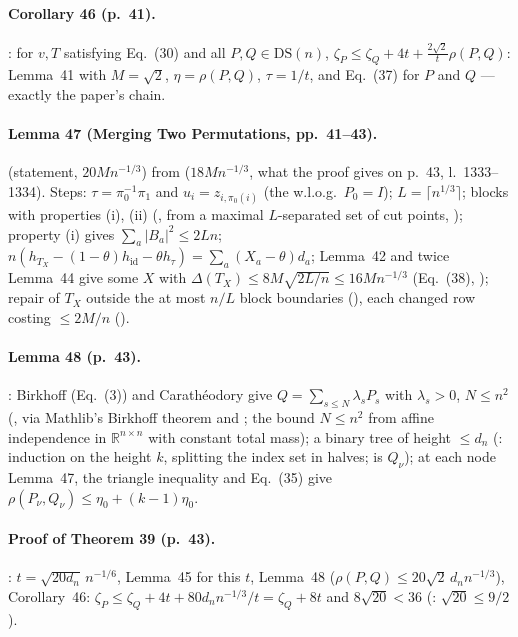 \paragraph{Corollary 46 (p.~41).} : for $v,T$ satisfying Eq.~(30) and all $P,Q\in\mathrm{DS}(n)$,
$\zeta_P\le\zeta_Q+4t+\frac{2\sqrt2}{t}\rho(P,Q)$: Lemma~41 with $M=\sqrt2$, $\eta=\rho(P,Q)$, $\tau=1/t$, and Eq.~(37)
for $P$ and $Q$ --- exactly the paper's chain.

\paragraph{Lemma 47 (Merging Two Permutations, pp.~41--43).}  (statement, $20Mn^{-1/3}$) from
 ($18Mn^{-1/3}$, what the proof gives on p.~43, l.~1333--1334). Steps: $\tau=\pi_0^{-1}\pi_1$ and
$u_i=z_{i,\pi_0(i)}$ (the w.l.o.g.\ $P_0=I$); $L=\lceil n^{1/3}\rceil$; blocks with properties (i), (ii)
(, from a maximal $L$-separated set of cut points, ); property (i) gives
$\sum_a|B_a|^2\le2Ln$; $n(h_{T_X}-(1-\theta)h_{\mathrm{id}}-\theta h_\tau)=\sum_a(X_a-\theta)d_a$; Lemma~42 and twice
Lemma~44 give some $X$ with $\Delta(T_X)\le8M\sqrt{2L/n}\le16Mn^{-1/3}$ (Eq.~(38), ); repair
of $T_X$ outside the at most $n/L$ block boundaries (), each changed row costing
$\le2M/n$ ().

\paragraph{Lemma 48 (p.~43).} : Birkhoff (Eq.~(3)) and Carath\'eodory give
$Q=\sum_{s\le N}\lambda_sP_s$ with $\lambda_s>0$, $N\le n^2$ (, via Mathlib's Birkhoff theorem and
; the bound $N\le n^2$ from affine independence in $\mathbb R^{n\times n}$
with constant total mass); a binary tree of height $\le d_n$ (: induction on the height $k$, splitting the
index set in halves;  is $Q_\nu$); at each node Lemma~47, the triangle inequality and Eq.~(35) give
$\rho(P_\nu,Q_\nu)\le\eta_0+(k-1)\eta_0$.

\paragraph{Proof of Theorem 39 (p.~43).} : $t=\sqrt{20d_n}\,n^{-1/6}$, Lemma~45 for this $t$,
Lemma~48 ($\rho(P,Q)\le20\sqrt2\,d_nn^{-1/3}$), Corollary~46: $\zeta_P\le\zeta_Q+4t+80d_nn^{-1/3}/t=\zeta_Q+8t$ and
$8\sqrt{20}<36$ (: $\sqrt{20}\le9/2$).

